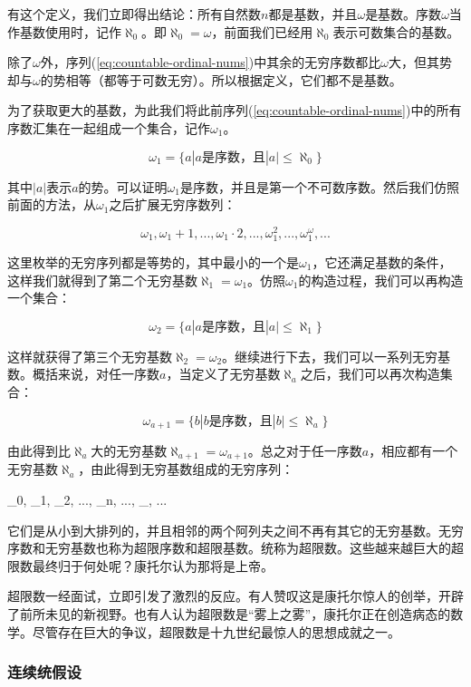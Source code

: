 \documentclass{article}
\begin{document}
有这个定义，我们立即得出结论：所有自然数$n$都是基数，并且$\omega$是基数。序数$\omega$当作基数使用时，记作$\aleph_0$。即$\aleph_0 = \omega$，前面我们已经用$\aleph_0$表示可数集合的基数。

除了$\omega$外，序列(\ref{eq:countable-ordinal-nums})中其余的无穷序数都比$\omega$大，但其势却与$\omega$的势相等（都等于可数无穷）。所以根据定义，它们都不是基数。

为了获取更大的基数，为此我们将此前序列(\ref{eq:countable-ordinal-nums})中的所有序数汇集在一起组成一个集合，记作$\omega_1$。

\[
\omega_1 = \{ a | a \text{是序数，且} |a| \leq \aleph_0\}
\]

其中$|a|$表示$a$的势。可以证明$\omega_1$是序数，并且是第一个不可数序数。然后我们仿照前面的方法，从$\omega_1$之后扩展无穷序数列：

\[
\omega_1, \omega_1 + 1, ..., \omega_1 \cdot 2, ..., \omega_1^2, ..., \omega_1^\omega, ...
\]

这里枚举的无穷序列都是等势的，其中最小的一个是$\omega_1$，它还满足基数的条件，这样我们就得到了第二个无穷基数$\aleph_1 = \omega_1$。仿照$\omega_1$的构造过程，我们可以再构造一个集合：

\[
\omega_2 = \{ a | a \text{是序数，且} |a| \leq \aleph_1\}
\]

这样就获得了第三个无穷基数$\aleph_2 = \omega_2$。继续进行下去，我们可以一系列无穷基数。概括来说，对任一序数$a$，当定义了无穷基数$\aleph_a$之后，我们可以再次构造集合：

\[
\omega_{a+1} = \{ b | b \text{是序数，且} |b| \leq \aleph_a\}
\]

由此得到比$\aleph_a$大的无穷基数$\aleph_{a+1} = \omega_{a+1}$。总之对于任一序数$a$，相应都有一个无穷基数$\aleph_a$，由此得到无穷基数组成的无穷序列：

\be
\aleph_0, \aleph_1, \aleph_2, ..., \aleph_n, ..., \aleph_{\omega}, ...
\ee

它们是从小到大排列的，并且相邻的两个阿列夫之间不再有其它的无穷基数。无穷序数和无穷基数也称为超限序数和超限基数。统称为超限数。这些越来越巨大的超限数最终归于何处呢？康托尔认为那将是上帝。

超限数一经面试，立即引发了激烈的反应。有人赞叹这是康托尔惊人的创举，开辟了前所未见的新视野。也有人认为超限数是“雾上之雾”，康托尔正在创造病态的数学。尽管存在巨大的争议，超限数是十九世纪最惊人的思想成就之一。

\subsubsection{连续统假设}
\end{document}
